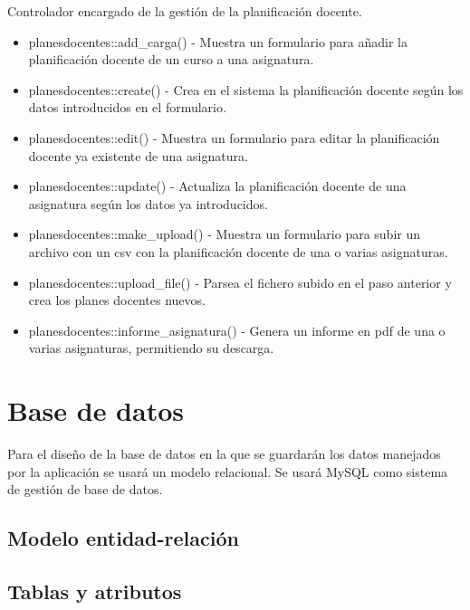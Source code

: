 Controlador encargado de la gestión de la planificación docente.

\begin{itemize}
\item planesdocentes::add\_carga() - Muestra un formulario para añadir la planificación docente de un curso a una asignatura.
\item planesdocentes::create() - Crea en el sistema la planificación docente según los datos introducidos en el formulario.
\item planesdocentes::edit() - Muestra un formulario para editar la planificación docente ya existente de una asignatura.
\item planesdocentes::update() - Actualiza la planificación docente de una asignatura según los datos ya introducidos.
\item planesdocentes::make\_upload() - Muestra un formulario para subir un archivo con un csv con la planificación docente de una o varias asignaturas.
\item planesdocentes::upload\_file() - Parsea el fichero subido en el paso anterior y crea los planes docentes nuevos.
\item planesdocentes::informe\_asignatura() - Genera un informe en pdf de una o varias asignaturas, permitiendo su descarga.
\end{itemize}

\section{Base de datos}
Para el diseño de la base de datos en la que se guardarán los datos manejados por la aplicación se usará un modelo relacional. Se usará MySQL como sistema de gestión de base de datos. 
\subsection{Modelo entidad-relación}

\subsection{Tablas y atributos}

